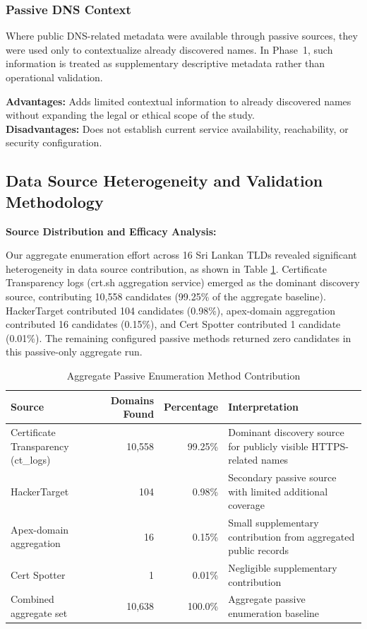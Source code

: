 \documentclass[preprint,review,12pt]{elsarticle}
\begin{document}
\subsubsection{Passive DNS Context}
Where public DNS-related metadata were available through passive sources, they were used only to contextualize already discovered names. In Phase~1, such information is treated as supplementary descriptive metadata rather than operational validation.

\textbf{Advantages:} Adds limited contextual information to already discovered names without expanding the legal or ethical scope of the study. \\
\textbf{Disadvantages:} Does not establish current service availability, reachability, or security configuration.

\subsection{Data Source Heterogeneity and Validation Methodology}

\textbf{Source Distribution and Efficacy Analysis:}

Our aggregate enumeration effort across 16 Sri Lankan TLDs revealed significant heterogeneity in data source contribution, as shown in Table \ref{tab:source_metrics}. Certificate Transparency logs (crt.sh aggregation service) emerged as the dominant discovery source, contributing 10,558 candidates (99.25\% of the aggregate baseline). HackerTarget contributed 104 candidates (0.98\%), apex-domain aggregation contributed 16 candidates (0.15\%), and Cert Spotter contributed 1 candidate (0.01\%). The remaining configured passive methods returned zero candidates in this passive-only aggregate run.

\begin{table}[H]
\centering
\caption{Aggregate Passive Enumeration Method Contribution}
\label{tab:source_metrics}
\begin{tabular}{|l|r|r|p{4cm}|}
\hline
Source & Domains Found & Percentage & Interpretation \\
\hline
Certificate Transparency (ct\_logs) & 10,558 & 99.25\% & Dominant discovery source for publicly visible HTTPS-related names \\
\hline
HackerTarget & 104 & 0.98\% & Secondary passive source with limited additional coverage \\
\hline
Apex-domain aggregation & 16 & 0.15\% & Small supplementary contribution from aggregated public records \\
\hline
Cert Spotter & 1 & 0.01\% & Negligible supplementary contribution \\
\hline
Combined aggregate set & 10,638 & 100.0\% & Aggregate passive enumeration baseline \\
\hline
\end{tabular}
\end{table}
\end{document}
